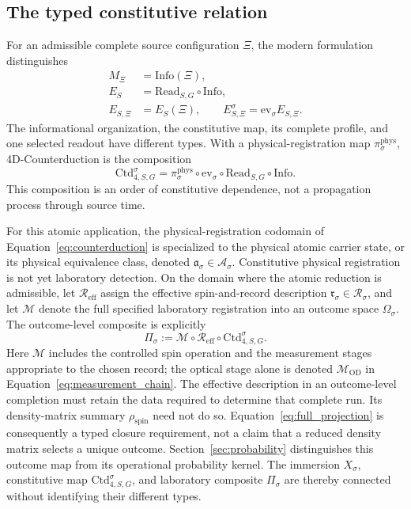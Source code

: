 \documentclass[11pt,a4paper]{article}
\theoremstyle{definition}
\theoremstyle{remark}
\begin{document}
\subsection{The typed constitutive relation}
For an admissible complete source configuration $\Xi$, the modern formulation distinguishes
\begin{align}
 M_\Xi&=\mathrm{Info}(\Xi),\nonumber\\
 E_S&=\mathrm{Read}_{S,G}\circ\mathrm{Info},\nonumber\\
 E_{S,\Xi}&=E_S(\Xi),\qquad
 E^\sigma_{S,\Xi}=\mathrm{ev}_\sigma E_{S,\Xi}.
 \label{eq:ecl}
\end{align}
The informational organization, the constitutive map, its complete profile, and one selected readout have different types. With a physical-registration map $\pi^{\mathrm{phys}}_\sigma$, 4D-Counterduction is the composition
\begin{equation}
 \mathrm{Ctd}^{\sigma}_{4,S,G}
 =\pi^{\mathrm{phys}}_\sigma\circ\mathrm{ev}_\sigma
   \circ\mathrm{Read}_{S,G}\circ\mathrm{Info}.
 \label{eq:counterduction}
\end{equation}
This composition is an order of constitutive dependence, not a propagation process through source time.\cite{foundation}

For this atomic application, the physical-registration codomain of Equation~\eqref{eq:counterduction} is specialized to the physical atomic carrier state, or its physical equivalence class, denoted $\mathfrak a_\sigma\in\mathcal A_\sigma$. Constitutive physical registration is not yet laboratory detection. On the domain where the atomic reduction is admissible, let $\mathcal R_{\mathrm{eff}}$ assign the effective spin-and-record description $\mathfrak r_\sigma\in\mathcal R_\sigma$, and let $\mathcal M$ denote the full specified laboratory registration into an outcome space $\Omega_\sigma$. The outcome-level composite is explicitly
\begin{equation}
 \Pi_\sigma:=\mathcal M\circ\mathcal R_{\mathrm{eff}}
                 \circ\mathrm{Ctd}^{\sigma}_{4,S,G}.
 \tag{4a}\label{eq:full_projection}
\end{equation}
Here $\mathcal M$ includes the controlled spin operation and the measurement stages appropriate to the chosen record; the optical stage alone is denoted $\mathcal M_{\mathrm{OD}}$ in Equation~\eqref{eq:measurement_chain}. The effective description in an outcome-level completion must retain the data required to determine that complete run. Its density-matrix summary $\rho_{\mathrm{spin}}$ need not do so. Equation~\eqref{eq:full_projection} is consequently a typed closure requirement, not a claim that a reduced density matrix selects a unique outcome. Section~\ref{sec:probability} distinguishes this outcome map from its operational probability kernel. The immersion $X_\sigma$, constitutive map $\mathrm{Ctd}^{\sigma}_{4,S,G}$, and laboratory composite $\Pi_\sigma$ are thereby connected without identifying their different types.\cite{foundation,born}
\end{document}
